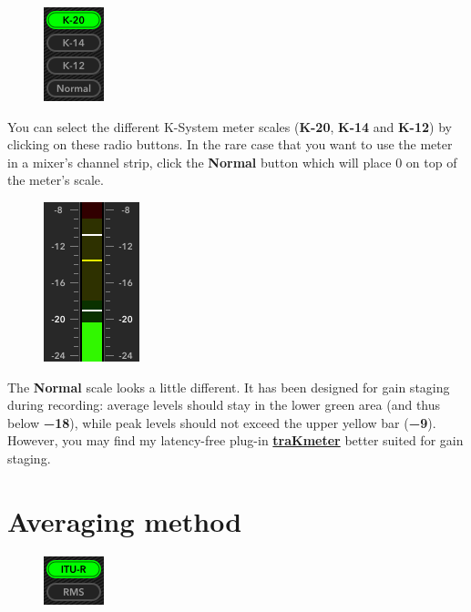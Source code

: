 \begin{figure}
\includegraphics[scale=\screenshotscale,clip]{include/images/button_meter_selection.png}
\end{figure}

You can select the different K-System meter scales (\textbf{K-20},
\textbf{K-14} and \textbf{K-12}) by clicking on these radio buttons.
In the rare case that you want to use the meter in a mixer's channel
strip, click the \textbf{Normal} button which will place \SI{0}{\dBFS}
on top of the meter's scale.

\begin{figure}
\includegraphics[scale=0.60,clip]{include/images/kmeter_normal_scale.png}
\end{figure}

The \textbf{Normal} scale looks a little different.  It has been
designed for gain staging during recording: average levels should stay
in the lower green area (and thus below \textbf{\SI{-18}{\dBFS}}),
while peak levels should not exceed the upper yellow bar
(\textbf{\SI{-9}{\dBFS}}).  However, you may find my latency-free
plug-in \href{http://code.mzuther.de/}{\textbf{traKmeter}} better
suited for gain staging.

\newpage %

\section{Averaging method}

\begin{figure}
\includegraphics[scale=\screenshotscale,clip]{include/images/button_averaging_selection.png}
\end{figure}

